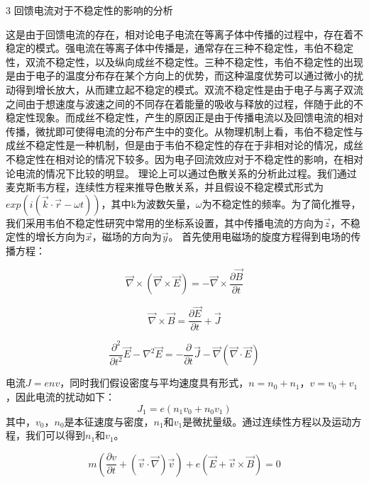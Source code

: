 3 回馈电流对于不稳定性的影响的分析

这是由于回馈电流的存在，相对论电子电流在等离子体中传播的过程中，存在着不稳定的模式。强电流在等离子体中传播是，通常存在三种不稳定性，韦伯不稳定性，双流不稳定性，以及纵向成丝不稳定性。三种不稳定性，韦伯不稳定性的出现是由于电子的温度分布存在某个方向上的优势，而这种温度优势可以通过微小的扰动得到增长放大，从而建立起不稳定的模式。双流不稳定性是由于电子与离子双流之间由于想速度与波速之间的不同存在着能量的吸收与释放的过程，伴随于此的不稳定性现象。而成丝不稳定性，产生的原因正是由于传播电流以及回馈电流的相对传播，微扰即可使得电流的分布产生中的变化。从物理机制上看，韦伯不稳定性与成丝不稳定性是一种机制，但是由于韦伯不稳定性的存在于非相对论的情况，成丝不稳定性在相对论的情况下较多。因为电子回流效应对于不稳定性的影响，在相对论电流的情况下比较的明显。
理论上可以通过色散关系的分析此过程。我们通过麦克斯韦方程，连续性方程来推导色散关系，并且假设不稳定模式形式为$exp(i (\vec{k} \cdot \vec{r} -\omega t))$，其中k为波数矢量，$\omega$为不稳定性的频率。为了简化推导，我们采用韦伯不稳定性研究中常用的坐标系设置，其中传播电流的方向为$\vec{z}$，不稳定性的增长方向为$\vec{x}$，磁场的方向为$\vec{y}$。
首先使用电磁场的旋度方程得到电场的传播方程：


\begin{equation}
\vec{\nabla} \times ( \vec{\nabla} \times \vec{E})= - \vec{\nabla} \times \frac{ \partial{\vec{B}}}{\partial{t}}
\end{equation}


\begin{equation}
\vec{\nabla} \times \vec{B}= \frac{ \partial{\vec{E}}}{\partial{t}} + \vec{J}
\end{equation}


\begin{equation}
\frac{\partial^2}{\partial{t^2}} \vec{E} - \nabla^2{\vec{E}} = - \frac{\partial}{\partial{t}} {\vec{J}}- \vec{\nabla} (\vec{\nabla} \cdot \vec{E})
\end{equation}


电流$ J =e n v$，同时我们假设密度与平均速度具有形式，$n= n_0+n_1$，$v=v_0+v_1$，因此电流的扰动如下：
\begin{equation}
J_1= e(n_1 v_0+ n_0 v_1)
\end{equation}
其中，$v_0$，$n_0$是本征速度与密度，$n_1$和$v_1$是微扰量级。通过连续性方程以及运动方程，我们可以得到$n_1$和$v_1$。

\begin{equation}
m (\frac{\partial{v}}{\partial{t}} + (\vec{v} \cdot \vec{\nabla}) \vec{v}) + e(\vec{E}+ \vec{v} \times \vec{B}) = 0
\end{equation}

